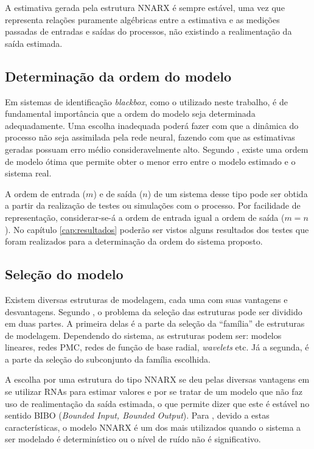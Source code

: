 A estimativa gerada pela estrutura NNARX é sempre estável, uma vez que
representa relações puramente algébricas entre a estimativa e as medições
passadas de entradas e saídas do processos, não existindo a realimentação da
saída estimada.

\subsection{Determinação da ordem do modelo}
\label{sec:det_ordem}
Em sistemas de identificação {\it blackbox}, como o utilizado neste trabalho, é
de fundamental importância que a ordem do modelo seja determinada adequadamente.
Uma escolha inadequada poderá fazer com que a dinâmica do processo não seja
assimilada pela rede neural, fazendo com que as estimativas geradas possuam erro
médio consideravelmente alto. Segundo , existe uma ordem
de modelo ótima que permite obter o menor erro entre o modelo estimado e o
sistema real.

A ordem de entrada ($m$) e de saída ($n$) de um sistema desse tipo pode ser
obtida a partir da realização de testes ou simulações com o processo. Por
facilidade de representação, considerar-se-á a ordem de entrada igual a ordem de
saída ($m = n$). No capítulo \ref{cap:resultados} poderão ser vistos alguns
resultados dos testes que foram realizados para a determinação da ordem do
sistema proposto.

\subsection{Seleção do modelo}
Existem diversas estruturas de modelagem, cada uma com suas vantagens e
desvantagens. Segundo , o problema da seleção das
estruturas pode ser dividido em duas partes. A primeira delas é a parte da
seleção da ``família'' de estruturas de modelagem. Dependendo do sistema, as
estruturas podem ser: modelos lineares, redes PMC, redes de função de base
radial, {\it wavelets} etc. Já a segunda, é a parte da seleção do subconjunto da
família escolhida.

A escolha por uma estrutura do tipo NNARX se deu pelas diversas vantagens em se
utilizar RNAs para estimar valores e por se tratar de um modelo que não faz uso
de realimentação da saída estimada, o que permite dizer que este é estável no
sentido BIBO ({\it Bounded Input, Bounded Output}). Para
, devido a estas características, o modelo NNARX é um
dos mais utilizados quando o sistema a ser modelado é determinístico ou o nível
de ruído não é significativo.

